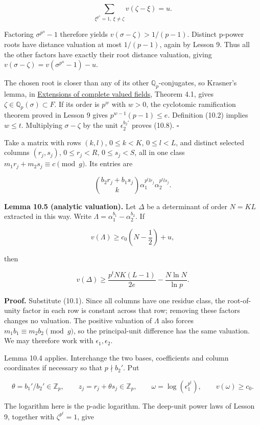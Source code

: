 \documentclass[
  11pt,
  a4paper,
]{article}
\begin{document}
\[
\sum_{\xi^{p^u}=1,\ \xi\ne\zeta}v(\zeta-\xi)=u.
\]

Factoring \(\sigma^{p^u}-1\) therefore yields
\(v(\sigma-\zeta)>1/(p-1)\). Distinct p-power roots have distance
valuation at most \(1/(p-1)\), again by Lesson 9. Thus all the other
factors have exactly their root distance valuation, giving
\(v(\sigma-\zeta)=v(\sigma^{p^u}-1)-u\).

The chosen root is closer than any of its other
\(\mathbb Q_p\)-conjugates, so Krasner's lemma, in
\href{../../NT-LOC/NT-LOC-04.html\#4-when-proximity-forces-containment}{Extensions
of complete valued fields}, Theorem 4.1, gives
\(\zeta\in\mathbb Q_p(\sigma)\subset F\). If its order is \(p^w\) with
\(w>0\), the cyclotomic ramification theorem proved in Lesson 9 gives
\(p^{w-1}(p-1)\le e\). Definition (10.2) implies \(w\le t\). Multiplying
\(\sigma-\zeta\) by the unit \(\epsilon_2^{b_2'}\) proves (10.8).
\(\square\)

Take a matrix with rows \((k,l)\), \(0\le k<K\), \(0\le l<L\), and
distinct selected columns \((r_j,s_j)\), \(0\le r_j<R\), \(0\le s_j<S\),
all in one class \(m_1r_j+m_2s_j\equiv c\pmod g\). Its entries are

\[
\binom{b_2r_j+b_1s_j}{k}\alpha_1^{p^t l r_j}\alpha_2^{p^t l s_j}.
\tag{10.9}
\]

\textbf{Lemma 10.5 (analytic valuation).} Let \(\Delta\) be a
determinant of order \(N=KL\) extracted in this way. Write
\(\Lambda=\alpha_1^{b_1}-\alpha_2^{b_2}\). If

\[
v(\Lambda)\ge c_0\left(N-\frac12\right)+u,
\]

then

\[
v(\Delta)\ge\frac{p^tNK(L-1)}{2e}-\frac{N\ln N}{\ln p}.
\tag{10.10}
\]

\textbf{Proof.} Substitute (10.1). Since all columns have one residue
class, the root-of-unity factor in each row is constant across that row;
removing these factors changes no valuation. The positive valuation of
\(\Lambda\) also forces \(m_1b_1\equiv m_2b_2\pmod g\), so the
principal-unit difference has the same valuation. We may therefore work
with \(\epsilon_1,\epsilon_2\).

Lemma 10.4 applies. Interchange the two bases, coefficients and column
coordinates if necessary so that \(p\nmid b_2'\). Put

\[
\theta=b_1'/b_2'\in\mathbb Z_p,\qquad
z_j=r_j+\theta s_j\in\mathbb Z_p,\qquad
\omega=\log(\epsilon_1^{p^t}),\qquad v(\omega)\ge c_0.
\]

The logarithm here is the p-adic logarithm. The deep-unit power laws of
Lesson 9, together with \(\zeta^{p^t}=1\), give
\end{document}

